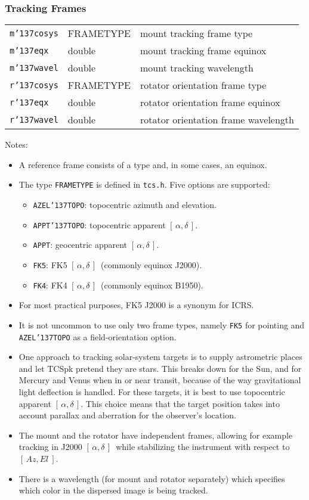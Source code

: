 \documentclass[12pt,fleqn,twoside]{article}
\renewcommand{\_}{{\tt\char'137}}     %
\newcommand{\radec}     {$[\,\alpha,\delta\,]$}
\newcommand{\azel}      {$[\,Az,El~]$}
\newcommand{\notelist}  {\goodbreak \vspace{1ex} Notes:
                        \vspace{-3ex}}
\begin{document}
\subsubsection{Tracking Frames}
\begin{tabular}{lll}
{\tt m\_cosys} & {FRAMETYPE} & mount tracking frame type \\
{\tt m\_eqx} & {double} & mount tracking frame equinox \\
{\tt m\_wavel} & {double} & mount tracking wavelength \\
{\tt r\_cosys} & {FRAMETYPE} & rotator orientation frame type \\
{\tt r\_eqx} & {double} & rotator orientation frame equinox \\
{\tt r\_wavel} & {double} & rotator orientation frame wavelength \\
\end{tabular}

\notelist
\begin{itemize}
\item A reference frame consists of a type and, in some cases,
      an equinox.
\item The type {\tt FRAMETYPE} is defined in {\tt tcs.h}.  Five
      options are supported:
      \begin{itemize}
      \item {\tt AZEL\_TOPO}: topocentric azimuth and elevation.
      \item {\tt APPT\_TOPO}: topocentric apparent \radec.
      \item {\tt APPT}: geocentric apparent \radec.
      \item {\tt FK5}: FK5 \radec\ (commonly equinox J2000).
      \item {\tt FK4}: FK4 \radec\ (commonly equinox B1950).
      \end{itemize}
\item For most practical purposes, FK5 J2000 is a synonym for ICRS.
\item It is not uncommon to use only two frame types, namely
      {\tt FK5} for pointing and {\tt AZEL\_TOPO} as a field-orientation
      option.
\item One approach to tracking solar-system targets is to supply
      astrometric places and let TCSpk pretend they are stars.  This
      breaks down for the Sun, and for Mercury and Venus when in or near
      transit, because of the way gravitational light deflection is
      handled.  For these targets, it is best to use topocentric
      apparent \radec.  This choice means that the target position
      takes into account parallax and aberration for the
      observer's location.
\item The mount and the rotator have independent frames, allowing for
      example tracking in J2000 \radec\ while stabilizing the
      instrument with respect to \azel.
\item There is a wavelength
      (for mount and rotator separately) which specifies which color
      in the dispersed image is being tracked.
\end{itemize}
\end{document}
